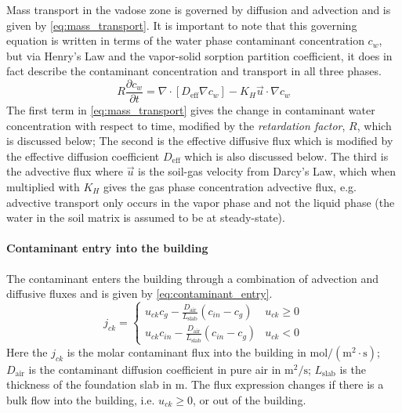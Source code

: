 Mass transport in the vadose zone is governed by diffusion and advection and is given by \eqref{eq:mass_transport}.
It is important to note that this governing equation is written in terms of the water phase contaminant concentration $c_w$, but via Henry's Law and the vapor-solid sorption partition coefficient, it does in fact describe the contaminant concentration and transport in all three phases.
\begin{equation}\label{eq:mass_transport}
  R \frac{\partial c_w}{\partial t} =
    \nabla \cdot[ D_\mathrm{eff} \nabla c_w] -
    K_H \vec{u} \cdot \nabla c_w
\end{equation}
The first term in \eqref{eq:mass_transport} gives the change in contaminant water concentration with respect to time, modified by the \textit{retardation factor}, $R$, which is discussed below;
The second is the effective diffusive flux which is modified by the effective diffusion coefficient $D_\mathrm{eff}$ which is also discussed below.
The third is the advective flux where $\vec{u}$ is the soil-gas velocity from Darcy's Law, which when multiplied with $K_H$ gives the gas phase concentration advective flux, e.g. advective transport only occurs in the vapor phase and not the liquid phase (the water in the soil matrix is assumed to be at steady-state).\par

\paragraph{Contaminant entry into the building}

The contaminant enters the building through a combination of advection and diffusive fluxes and is given by \eqref{eq:contaminant_entry}.
\begin{equation}\label{eq:contaminant_entry}
  j_{ck} = \begin{cases}
    u_{ck} c_g - \frac{D_\mathrm{air}}{L_\mathrm{slab}} (c_{in} - c_g) & u_{ck} \geq 0 \\
    u_{ck} c_{in} - \frac{D_\mathrm{air}}{L_\mathrm{slab}} (c_{in} - c_g) & u_{ck} < 0
\end{cases}
\end{equation}
Here the $j_{ck}$ is the molar contaminant flux into the building in $\mathrm{mol/(m^2 \cdot s)}$;
$D_\mathrm{air}$ is the contaminant diffusion coefficient in pure air in $\mathrm{m^2/s}$;
$L_\mathrm{slab}$ is the thickness of the foundation slab in $\mathrm{m}$.
The flux expression changes if there is a bulk flow into the building, i.e. $u_{ck} \geq 0$, or out of the building.

